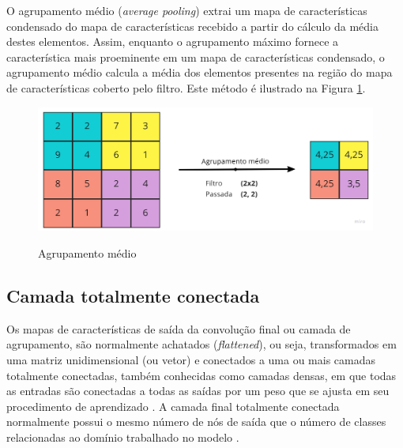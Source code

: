 \documentclass[
	12pt,				%
	oneside,			%
	a4paper,			%
	english,			%
	brazil				%
	]{abntex2ppgsi}
\begin{document}
O agrupamento médio (\textit{average pooling}) extrai um mapa de características condensado do mapa de características recebido a partir do cálculo da média destes elementos. Assim, enquanto o agrupamento máximo fornece a característica mais proeminente em um mapa de características condensado, o agrupamento médio calcula a média dos elementos presentes na região do mapa de características coberto pelo filtro. Este método é ilustrado na Figura \ref{fig:average_pooling}.

\begin{figure}[H]
    \centering
    \caption{Agrupamento médio}
    \includegraphics[width=1.0\textwidth]{imagens/conceitos_basicos/agrupamento_medio.jpg}
    \label{fig:average_pooling}
\end{figure}
 
\subsection{Camada totalmente conectada}
Os mapas de características de saída da convolução final ou camada de agrupamento, são normalmente achatados (\textit{flattened}), ou seja, transformados em uma matriz unidimensional (ou vetor) e conectados a uma ou mais camadas totalmente conectadas, também conhecidas como camadas densas, em que todas as entradas são conectadas a todas as saídas por um peso que se ajusta em seu procedimento de aprendizado \cite{yamashita2018convolutional}. A camada final totalmente conectada normalmente possui o mesmo número de nós de saída que o número de classes relacionadas ao domínio trabalhado no modelo \cite{yamashita2018convolutional}.
\end{document}
